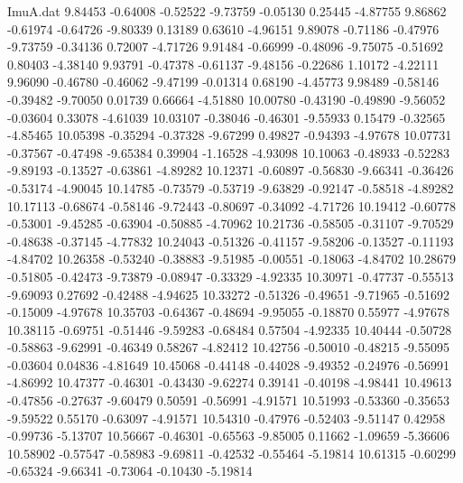 \begin{filecontents}{ImuA.dat}
   9.84453   -0.64008   -0.52522   -9.73759   -0.05130    0.25445   -4.87755
   9.86862   -0.61974   -0.64726   -9.80339    0.13189    0.63610   -4.96151
   9.89078   -0.71186   -0.47976   -9.73759   -0.34136    0.72007   -4.71726
   9.91484   -0.66999   -0.48096   -9.75075   -0.51692    0.80403   -4.38140
   9.93791   -0.47378   -0.61137   -9.48156   -0.22686    1.10172   -4.22111
   9.96090   -0.46780   -0.46062   -9.47199   -0.01314    0.68190   -4.45773
   9.98489   -0.58146   -0.39482   -9.70050    0.01739    0.66664   -4.51880
  10.00780   -0.43190   -0.49890   -9.56052   -0.03604    0.33078   -4.61039
  10.03107   -0.38046   -0.46301   -9.55933    0.15479   -0.32565   -4.85465
  10.05398   -0.35294   -0.37328   -9.67299    0.49827   -0.94393   -4.97678
  10.07731   -0.37567   -0.47498   -9.65384    0.39904   -1.16528   -4.93098
  10.10063   -0.48933   -0.52283   -9.89193   -0.13527   -0.63861   -4.89282
  10.12371   -0.60897   -0.56830   -9.66341   -0.36426   -0.53174   -4.90045
  10.14785   -0.73579   -0.53719   -9.63829   -0.92147   -0.58518   -4.89282
  10.17113   -0.68674   -0.58146   -9.72443   -0.80697   -0.34092   -4.71726
  10.19412   -0.60778   -0.53001   -9.45285   -0.63904   -0.50885   -4.70962
  10.21736   -0.58505   -0.31107   -9.70529   -0.48638   -0.37145   -4.77832
  10.24043   -0.51326   -0.41157   -9.58206   -0.13527   -0.11193   -4.84702
  10.26358   -0.53240   -0.38883   -9.51985   -0.00551   -0.18063   -4.84702
  10.28679   -0.51805   -0.42473   -9.73879   -0.08947   -0.33329   -4.92335
  10.30971   -0.47737   -0.55513   -9.69093    0.27692   -0.42488   -4.94625
  10.33272   -0.51326   -0.49651   -9.71965   -0.51692   -0.15009   -4.97678
  10.35703   -0.64367   -0.48694   -9.95055   -0.18870    0.55977   -4.97678
  10.38115   -0.69751   -0.51446   -9.59283   -0.68484    0.57504   -4.92335
  10.40444   -0.50728   -0.58863   -9.62991   -0.46349    0.58267   -4.82412
  10.42756   -0.50010   -0.48215   -9.55095   -0.03604    0.04836   -4.81649
  10.45068   -0.44148   -0.44028   -9.49352   -0.24976   -0.56991   -4.86992
  10.47377   -0.46301   -0.43430   -9.62274    0.39141   -0.40198   -4.98441
  10.49613   -0.47856   -0.27637   -9.60479    0.50591   -0.56991   -4.91571
  10.51993   -0.53360   -0.35653   -9.59522    0.55170   -0.63097   -4.91571
  10.54310   -0.47976   -0.52403   -9.51147    0.42958   -0.99736   -5.13707
  10.56667   -0.46301   -0.65563   -9.85005    0.11662   -1.09659   -5.36606
  10.58902   -0.57547   -0.58983   -9.69811   -0.42532   -0.55464   -5.19814
  10.61315   -0.60299   -0.65324   -9.66341   -0.73064   -0.10430   -5.19814

\end{filecontents}
